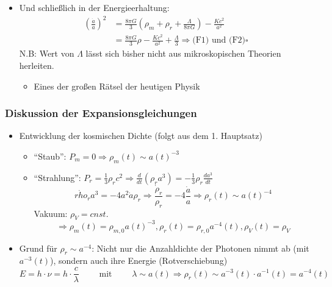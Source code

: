 \begin{itemize}
	\item Und schließlich in der Energieerhaltung:
		\begin{align*}
			\left(\frac{\dot{a}}{a}\right)^2&=\frac{8\pi G}{3}\left(\rho_m+\rho_r+\frac{\Lambda}{8\pi G}\right)-\frac{Kc^2}{a^2}\\
			&=\frac{8\pi G}{3}\rho-\frac{Kc^2}{a^2}+\frac{\Lambda}{3} \Rightarrow \text{(F1) und (F2)} \square
		\end{align*}
		N.B: Wert von $\Lambda$ lässt sich bisher nicht aus mikroskopischen Theorien herleiten.
		\begin{itemize}
			\item Eines der großen Rätsel der heutigen Physik
		\end{itemize}
\end{itemize}
\subsubsection{Diskussion der Expansionsgleichungen}
\begin{itemize}
	\item Entwicklung der kosmischen Dichte (folgt aus dem 1. Hauptsatz)
		\begin{itemize}[label={$\cdot$}]
			\item "`Staub"': $P_m=0\Rightarrow \rho_m(t)\sim a(t)^{-3}$
			\item "`Strahlung"': $P_r=\frac{1}{3}\rho_rc^2\Rightarrow \frac{d}{dt}\left(\rho_ra^3\right)=-\frac{1}{3}\rho_r\frac{da^3}{dt}$
				\begin{equation*}
					\dot{rho}_ra^3=-4a^2\dot{a}\rho_r \Rightarrow \frac{\dot{\rho}_r}{\rho_r}=-4\frac{\dot{a}}{a}\Rightarrow \rho_r(t)\sim a(t)^{-4}
				\end{equation*}
				Vakuum: $\rho_V=cnst.$\\
				\begin{equation*}
					\Rightarrow \rho_m(t)=\rho_{m,0}a(t)^{-3},\rho_r(t)=\rho_{r,0}a^{-4}(t),\rho_V(t)=\rho_V
				\end{equation*}
		\end{itemize}
	\item Grund für $\rho_r\sim a^{-4}$: Nicht nur die Anzahldichte der Photonen nimmt ab (mit $a^{-3}(t)$), sondern auch ihre Energie (Rotverschiebung)
		\begin{equation*}
			E=h\cdot\nu = h\cdot\frac{c}{\lambda}\qquad\text{ mit }\qquad\lambda\sim a(t)\Rightarrow \rho_r(t)\sim a^{-3}(t)\cdot a^{-1}(t)=a^{-4}(t)
		\end{equation*}
\end{itemize}
